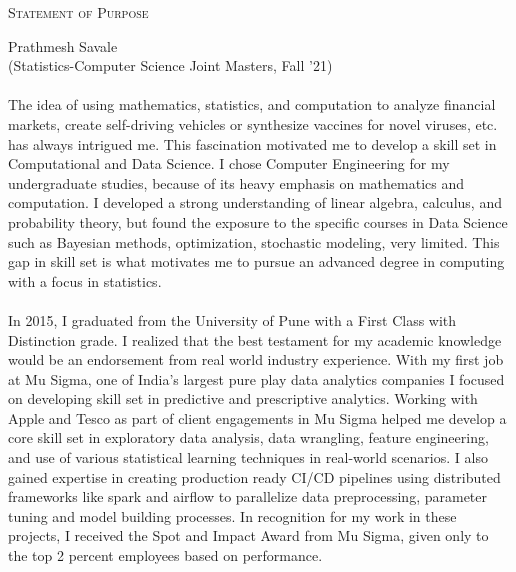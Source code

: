 \documentclass[letterpaper]{article}
\newcommand{\soptitle}{Statement of Purpose}
\newcommand{\yourname}{Prathmesh Savale}
\newcommand{\youremail}{(Statistics-Computer Science Joint Masters, Fall '21)}
\begin{document}
\begin{center}{\huge \scshape \soptitle}\end{center}
\begin{center}\vspace{0.2em} {\Large \yourname\\}
  {\youremail}\end{center}

\paragraph{}
The idea of using mathematics, statistics, and computation to analyze financial markets, create self-driving vehicles or synthesize vaccines for novel viruses, etc. has always intrigued me. This fascination motivated me to develop a skill set in Computational and Data Science. I chose Computer Engineering for my undergraduate studies, because of its heavy emphasis on mathematics and computation. I developed a strong understanding of linear algebra, calculus, and probability theory, but found the exposure to the specific courses in Data Science such as Bayesian methods, optimization, stochastic modeling, very limited. This gap in skill set is what motivates me to pursue an advanced degree in computing with a focus in statistics.


\paragraph{}
In 2015, I graduated from the University of Pune with a First Class with Distinction grade. I realized that the best testament for my academic knowledge would be an endorsement from real world industry experience. With my first job at Mu Sigma, one of India's largest pure play data analytics companies I focused on developing skill set in predictive and prescriptive analytics. Working with Apple and Tesco as part of client engagements in Mu Sigma helped me develop a core skill set in exploratory data analysis, data wrangling, feature engineering, and use of various statistical learning techniques in real-world scenarios. I also gained expertise in creating production ready CI/CD pipelines using distributed frameworks like spark and airflow to parallelize data preprocessing, parameter tuning and model building processes. In recognition for my work in these projects, I received the Spot and Impact Award from Mu Sigma, given only to the top 2 percent employees based on performance.
\end{document}
